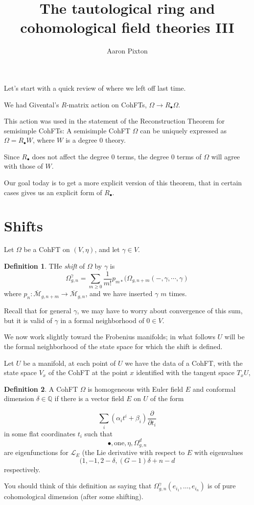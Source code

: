 \documentclass{amsart}
\title{The tautological ring and cohomological field theories III}
\author{Aaron Pixton}
\theoremstyle{definition}
\newtheorem{definition}{Definition}
\newcommand{\one}{\text{one}}
\newcommand{\Mbar}{\overline{\mathcal{M}}}
\newcommand{\Q}{\mathbb{Q}}
\begin{document}
\maketitle

Let's start with a quick review of where we left off last time.

We had Givental's $R$-matrix action on CohFTs, $\Omega\to R_\bullet\Omega$.  

This action was used in the statement of the Reconstruction Theorem for semisimple CohFTs: A semisimple CohFT $\Omega$ can be uniquely expressed as $\Omega=R_\bullet W$, where $W$ is a degree 0 theory.

Since $R_\bullet$ does not affect the degree 0 terms, the degree 0 terms of $\Omega$ will agree with those of $W$.

Our goal today is to get a more explicit version of this theorem, that in certain cases gives us an explicit form of $R_\bullet$.

\section{Shifts}

Let $\Omega$ be a CohFT on $(V, \eta)$, and let $\gamma\in V$.

\begin{definition}
THe \emph{shift} of $\Omega$ by $\gamma$ is 
$$\Omega_{g,n}^\gamma=\sum_{m\geq 0} \frac{1}{m!} p_{m*}(\Omega_{g,n+m}( - , \gamma,\cdots,\gamma)$$
where $p_n:\Mbar_{g,n+m}\to\Mbar_{g,n}$, and we have inserted $\gamma$ $m$ times.
\end{definition}

Recall that for general $\gamma$, we may have to worry about convergence of this sum, but it is valid of $\gamma$ in a formal neighborhood of $0\in V$. 

We now work slightly toward the Frobenius manifolds; in what follows $U$ will be the formal neighborhood of the state space for which the shift is defined.

Let $U$ be a manifold, at each point of $U$ we have the data of a CohFT, with the state space $V_x$ of the CohFT at the point $x$ identified with the tangent space $T_xU$,

\begin{definition}
A CohFT $\Omega$ is homogeneous with Euler field $E$ and conformal dimension $\delta\in\Q$ if there is a vector field $E$ on $U$ of the form

$$\sum_i (\alpha_it^i+\beta_i)\frac{\partial}{\partial t_i}$$
in some flat coordinates $t_i$ such that 
$$\bullet, \one, \eta, \Omega^d_{g,n}$$ are eigenfunctions for $\mathcal{L}_E$ (the Lie derivative with respect to $E$ with eigenvalues 
$$(1,-1,2-\delta, (G-1)\delta+n-d$$
respectively.
\end{definition}
You should think of this definition as saying that $\Omega^\gamma_{g,n}(e_{i_1},\dots,e_{i_n})$  is of pure cohomological dimension (after some shifting).
\end{document}
